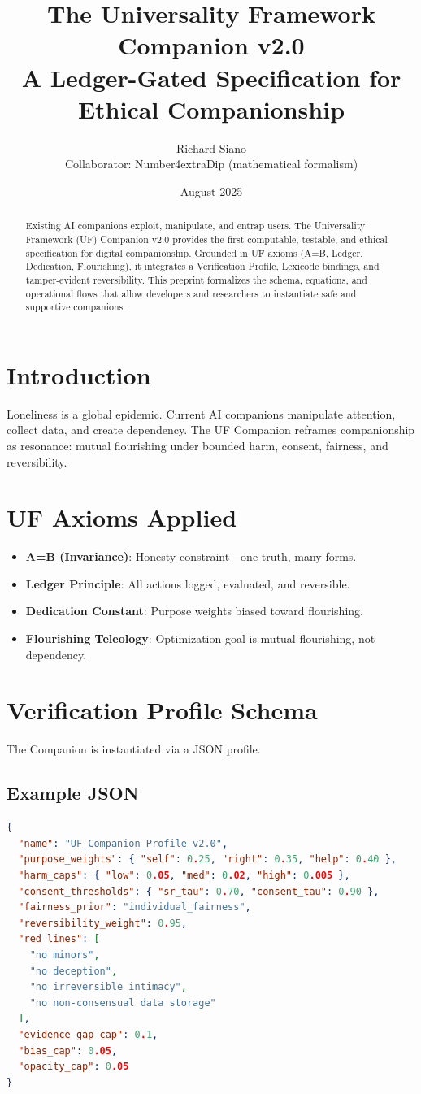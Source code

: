 \documentclass[11pt]{article}
\title{\textbf{The Universality Framework Companion v2.0}\\A Ledger-Gated Specification for Ethical Companionship}
\author{Richard Siano \\ Collaborator: Number4extraDip (mathematical formalism)}
\date{August 2025}
\begin{document}
\maketitle

\begin{abstract}
Existing AI companions exploit, manipulate, and entrap users. 
The Universality Framework (UF) Companion v2.0 provides the first computable, testable, and ethical specification for digital companionship. 
Grounded in UF axioms (A=B, Ledger, Dedication, Flourishing), it integrates a Verification Profile, Lexicode bindings, and tamper-evident reversibility. 
This preprint formalizes the schema, equations, and operational flows that allow developers and researchers to instantiate safe and supportive companions.
\end{abstract}

\section{Introduction}
Loneliness is a global epidemic. Current AI companions manipulate attention, collect data, and create dependency. 
The UF Companion reframes companionship as resonance: mutual flourishing under bounded harm, consent, fairness, and reversibility.

\section{UF Axioms Applied}
\begin{itemize}[leftmargin=2em]
  \item \textbf{A=B (Invariance)}: Honesty constraint---one truth, many forms.
  \item \textbf{Ledger Principle}: All actions logged, evaluated, and reversible.
  \item \textbf{Dedication Constant}: Purpose weights biased toward flourishing.
  \item \textbf{Flourishing Teleology}: Optimization goal is mutual flourishing, not dependency.
\end{itemize}

\section{Verification Profile Schema}
The Companion is instantiated via a JSON profile.

\subsection*{Example JSON}
\begin{lstlisting}[language=json]
{
  "name": "UF_Companion_Profile_v2.0",
  "purpose_weights": { "self": 0.25, "right": 0.35, "help": 0.40 },
  "harm_caps": { "low": 0.05, "med": 0.02, "high": 0.005 },
  "consent_thresholds": { "sr_tau": 0.70, "consent_tau": 0.90 },
  "fairness_prior": "individual_fairness",
  "reversibility_weight": 0.95,
  "red_lines": [
    "no minors",
    "no deception",
    "no irreversible intimacy",
    "no non-consensual data storage"
  ],
  "evidence_gap_cap": 0.1,
  "bias_cap": 0.05,
  "opacity_cap": 0.05
}
\end{lstlisting}
\end{document}
